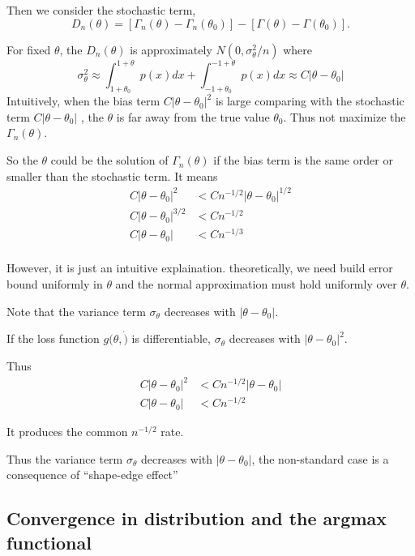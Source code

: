 Then we consider the stochastic term,
$$
D_n(\theta)=\left[\Gamma_n(\theta)-\Gamma_n\left(\theta_0\right)\right]-\left[\Gamma(\theta)-\Gamma\left(\theta_0\right)\right] .
$$

For fixed $\theta$,
the $D_n(\theta)$ is approximately $N(0,\sigma^2_\theta/n)$
where
$$
\sigma_\theta^2 \approx \int_{1+\theta_0}^{1+\theta} p(x) d x+\int_{-1+\theta_0}^{-1+\theta} p(x) d x \approx C\left|\theta-\theta_0\right|
$$
Intuitively, when the bias term $C|\theta - \theta_0|^2$  is large comparing with the stochastic term $C|\theta - \theta_0|$ , the $\theta$ is far away from the true value $\theta_0$.
Thus not maximize the $\Gamma_n(\theta)$.

So the $\theta$ could be the solution of $\Gamma_n(\theta)$ if the bias term is the same order or smaller than the stochastic term.
It means 
\begin{align*}
  C|\theta - \theta_0|^2 &< C n^{-1/2}|\theta - \theta_0|^{1/2} \\
  C|\theta - \theta_0|^{3/2} &< C n^{-1/2} \\
  C|\theta - \theta_0| &< C n^{-1/3} \\
\end{align*}

\begin{summary}
  However, it is just an intuitive explaination.
  theoretically, we need build error bound uniformly in $\theta$ and the normal approximation must hold uniformly over $\theta$.
\end{summary}

Note that the variance term $\sigma_\theta$ decreases with $|\theta - \theta_0|$.

If the loss function $g(\theta,\dot)$ is differentiable, 
$\sigma_\theta$ decreases with $|\theta - \theta_0|^2$.
 
Thus
\begin{align*}
  C|\theta - \theta_0|^2 &< C n^{-1/2}|\theta - \theta_0| \\
  C|\theta - \theta_0| &< C n^{-1/2}
\end{align*}

It produces the common $n^{-1/2}$ rate.

Thus the  variance term $\sigma_\theta$ decreases with $|\theta - \theta_0|$, the non-standard case is a consequence of ``shape-edge effect''


\subsection{Convergence in distribution and the argmax functional}